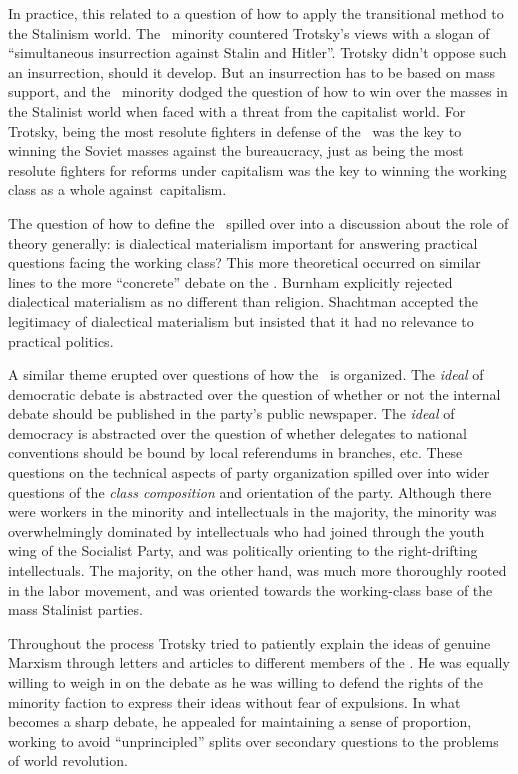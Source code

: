 In practice, this related to a question of how to apply the transitional method to the Stalinism world. The \SWP\ minority countered Trotsky’s views with a slogan of “simultaneous insurrection against Stalin and Hitler”. Trotsky didn’t oppose such an insurrection, should it develop. But an insurrection has to be based on mass support, and the \SWP\ minority dodged the question of how to win over the masses in the Stalinist world when faced with a threat from the capitalist world. For Trotsky, being the most resolute fighters in defense of the \USSR\ was the key to winning the Soviet masses against the bureaucracy, just as being the most resolute fighters for reforms under capitalism was the key to winning the working class as a whole against~capitalism.

The question of how to define the \USSR\ spilled over into a discussion about the role of theory generally: is dialectical materialism important for answering practical questions facing the working class? This more theoretical occurred on similar lines to the more “concrete” debate on the \USSR. Burnham explicitly rejected dialectical materialism as no different than religion. Shachtman accepted the legitimacy of dialectical materialism but insisted that it had no relevance to practical politics.

A similar theme erupted over questions of how the \SWP\ is organized. The \emph{ideal} of democratic debate is abstracted over the question of whether or not the internal debate should be published in the party’s public newspaper. The \emph{ideal} of democracy is abstracted over the question of whether delegates to national conventions should be bound by local referendums in branches, etc. These questions on the technical aspects of party organization spilled over into wider questions of the \emph{class composition} and orientation of the party. Although there were workers in the minority and intellectuals in the majority, the minority was overwhelmingly dominated by intellectuals who had joined through the youth wing of the Socialist Party, and was politically orienting to the right-drifting intellectuals. The majority, on the other hand, was much more thoroughly rooted in the labor movement, and was oriented towards the working-class base of the mass Stalinist parties.

Throughout the process Trotsky tried to patiently explain the ideas of genuine Marxism through letters and articles to different members of the \SWP. He was equally willing to weigh in on the debate as he was willing to defend the rights of the minority faction to express their ideas without fear of expulsions. In what becomes a sharp debate, he appealed for maintaining a sense of proportion, working to avoid “unprincipled” splits over secondary questions to the problems of world revolution.

